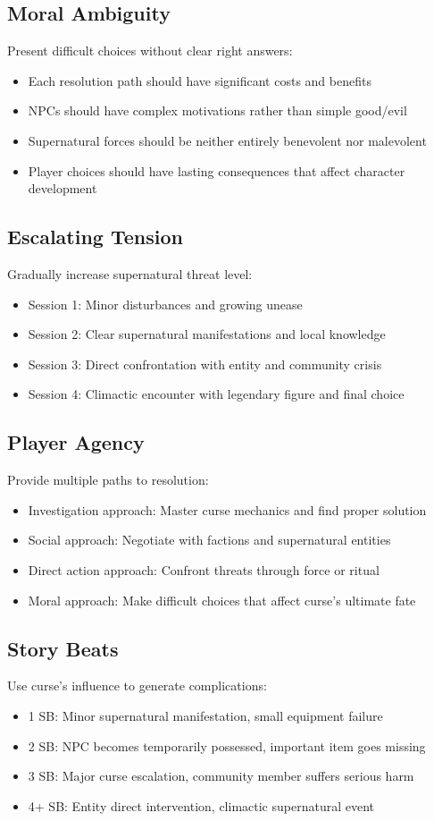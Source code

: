 \documentclass[11pt]{article}
\begin{document}
\subsection{Moral Ambiguity}
Present difficult choices without clear right answers:
\begin{itemize}
\item Each resolution path should have significant costs and benefits
\item NPCs should have complex motivations rather than simple good/evil
\item Supernatural forces should be neither entirely benevolent nor malevolent
\item Player choices should have lasting consequences that affect character development
\end{itemize}

\subsection{Escalating Tension}
Gradually increase supernatural threat level:
\begin{itemize}
\item Session 1: Minor disturbances and growing unease
\item Session 2: Clear supernatural manifestations and local knowledge
\item Session 3: Direct confrontation with entity and community crisis
\item Session 4: Climactic encounter with legendary figure and final choice
\end{itemize}

\subsection{Player Agency}
Provide multiple paths to resolution:
\begin{itemize}
\item Investigation approach: Master curse mechanics and find proper solution
\item Social approach: Negotiate with factions and supernatural entities
\item Direct action approach: Confront threats through force or ritual
\item Moral approach: Make difficult choices that affect curse's ultimate fate
\end{itemize}

\subsection{Story Beats}
Use curse's influence to generate complications:
\begin{itemize}
\item 1 SB: Minor supernatural manifestation, small equipment failure
\item 2 SB: NPC becomes temporarily possessed, important item goes missing
\item 3 SB: Major curse escalation, community member suffers serious harm
\item 4+ SB: Entity direct intervention, climactic supernatural event
\end{itemize}
\end{document}
